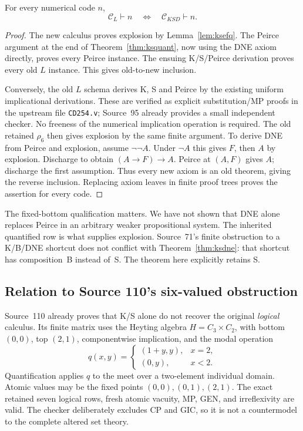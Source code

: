 \begin{theorem}
\label{thm:ksdne}
For every numerical code $n$,
\[
 \mathcal C_L\vdash n\quad\Longleftrightarrow\quad
 \mathcal C_{KSD}\vdash n.
\]
\end{theorem}
\begin{proof}
The new calculus proves explosion by Lemma~\ref{lem:ksefq}. The Peirce
argument at the end of Theorem~\ref{thm:ksquant}, now using the DNE
axiom directly, proves every Peirce instance. The ensuing K/S/Peirce
derivation proves every old $L$ instance. This gives old-to-new inclusion.

Conversely, the old $L$ schema derives K, S and Peirce by the existing
uniform implicational derivations. These are verified as explicit
substitution/MP proofs in the upstream file \texttt{CD254.v}; Source~95
already provides a small independent checker. No freeness of the
numerical implication operation is required. The old retained $\rho_6$
then gives explosion by the same finite argument. To derive DNE from
Peirce and explosion, assume $\neg\neg A$. Under $\neg A$ this gives
$F$, then $A$ by explosion. Discharge to obtain $(A\to F)\to A$.
Peirce at $(A,F)$ gives $A$; discharge the first assumption. Thus every
new axiom is an old theorem, giving the reverse inclusion. Replacing
axiom leaves in finite proof trees proves the assertion for every code.
\end{proof}

The fixed-bottom qualification matters. We have not shown that DNE
alone replaces Peirce in an arbitrary weaker propositional system.
The inherited quantified row is what supplies explosion. Source~71's
finite obstruction to a K/B/DNE shortcut does not conflict with
Theorem~\ref{thm:ksdne}: that shortcut has composition~B instead of~S.
The theorem here explicitly retains S.

\subsection{Relation to Source 110's six-valued obstruction}

Source~110 already proves that K/S alone do not recover the original
\emph{logical} calculus. Its finite matrix uses the Heyting algebra
$H=C_3\times C_2$, with bottom $(0,0)$, top $(2,1)$, componentwise
implication, and the modal operation
\[
 q(x,y)=
 \begin{cases}(1+y,y),&x=2,\\(0,y),&x<2.\end{cases}
\]
Quantification applies $q$ to the meet over a two-element individual
domain. Atomic values may be the fixed points $(0,0),(0,1),(2,1)$.
The exact retained seven logical rows, fresh atomic vacuity, MP, GEN,
and irreflexivity are valid. The checker deliberately excludes CP and
GIC, so it is not a countermodel to the complete altered set theory.

